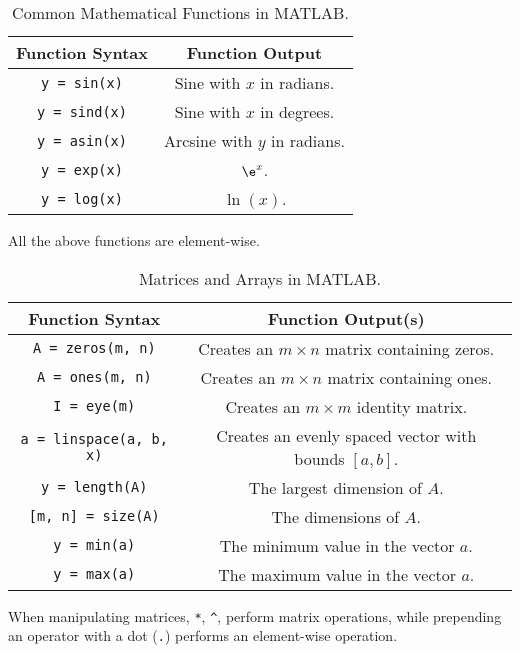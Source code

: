 \documentclass{article}
\begin{document}
\begin{table}[H]
    \centering
    \begin{tabular}{c | c}
        \toprule
        Function Syntax         & Function Output              \\
        \midrule
        \lstinline!y = sin(x)!  & Sine with $x$ in radians.    \\
        \lstinline!y = sind(x)! & Sine with $x$ in degrees.    \\
        \lstinline!y = asin(x)! & Arcsine with $y$ in radians. \\
        \lstinline!y = exp(x)!  & $\e^x$.                      \\
        \lstinline!y = log(x)!  & $\ln{\left( x \right)}$.     \\
        \bottomrule
    \end{tabular}
    \caption{Common Mathematical Functions in MATLAB.}
\end{table}
All the above functions are element-wise.
\begin{table}[H]
    \centering
    \begin{tabular}{c | c}
        \toprule
        Function Syntax                   & Function Output(s)                                               \\
        \midrule
        \lstinline!A = zeros(m, n)!       & Creates an $m \times n$ matrix containing zeros.                 \\
        \lstinline!A = ones(m, n)!        & Creates an $m \times n$ matrix containing ones.                  \\
        \lstinline!I = eye(m)!            & Creates an $m \times m$ identity matrix.                         \\
        \lstinline!a = linspace(a, b, x)! & Creates an evenly spaced vector with bounds $\left[a, b\right]$. \\
        \lstinline!y = length(A)!         & The largest dimension of $A$.                                    \\
        \lstinline![m, n] = size(A)!      & The dimensions of $A$.                                           \\
        \lstinline!y = min(a)!            & The minimum value in the vector $a$.                             \\
        \lstinline!y = max(a)!            & The maximum value in the vector $a$.                             \\
        \bottomrule
    \end{tabular}
    \caption{Matrices and Arrays in MATLAB.}
\end{table}
When manipulating matrices, \verb!*!, \verb!^!, perform matrix operations, while prepending an operator with a dot (\verb!.!) performs an element-wise operation.
\end{document}
